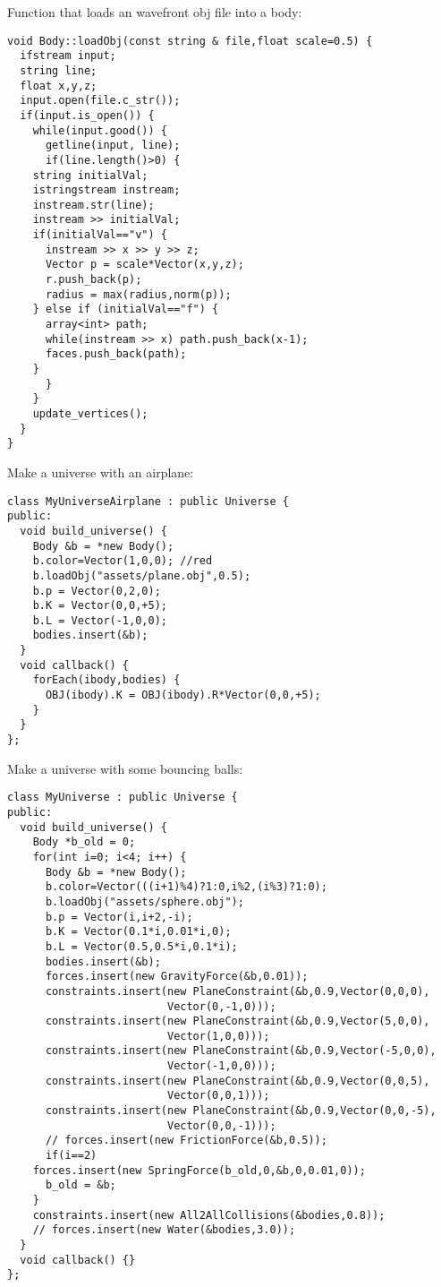 \noindent
Function that loads an wavefront obj file into a body: \begin{lstlisting}
void Body::loadObj(const string & file,float scale=0.5) {
  ifstream input;
  string line;
  float x,y,z;
  input.open(file.c_str());
  if(input.is_open()) {
    while(input.good()) {
      getline(input, line);
      if(line.length()>0) {
	string initialVal;
	istringstream instream;
	instream.str(line);
	instream >> initialVal;
	if(initialVal=="v") {
	  instream >> x >> y >> z;
	  Vector p = scale*Vector(x,y,z);
	  r.push_back(p);
	  radius = max(radius,norm(p));
	} else if (initialVal=="f") {
	  array<int> path;
	  while(instream >> x) path.push_back(x-1);
	  faces.push_back(path);
	}
      }
    }
    update_vertices();
  }
}
\end{lstlisting}
\noindent
Make a universe with an airplane: \begin{lstlisting}
class MyUniverseAirplane : public Universe {
public:
  void build_universe() {
    Body &b = *new Body();
    b.color=Vector(1,0,0); //red
    b.loadObj("assets/plane.obj",0.5);
    b.p = Vector(0,2,0);
    b.K = Vector(0,0,+5);
    b.L = Vector(-1,0,0);
    bodies.insert(&b);
  }
  void callback() {
    forEach(ibody,bodies) {
      OBJ(ibody).K = OBJ(ibody).R*Vector(0,0,+5);
    }
  }
};
\end{lstlisting}
\noindent
Make a universe with some bouncing balls: \begin{lstlisting}
class MyUniverse : public Universe {
public:
  void build_universe() {
    Body *b_old = 0;
    for(int i=0; i<4; i++) {
      Body &b = *new Body();
      b.color=Vector(((i+1)%4)?1:0,i%2,(i%3)?1:0);
      b.loadObj("assets/sphere.obj");
      b.p = Vector(i,i+2,-i);
      b.K = Vector(0.1*i,0.01*i,0);
      b.L = Vector(0.5,0.5*i,0.1*i);
      bodies.insert(&b);
      forces.insert(new GravityForce(&b,0.01));
      constraints.insert(new PlaneConstraint(&b,0.9,Vector(0,0,0),
					     Vector(0,-1,0)));
      constraints.insert(new PlaneConstraint(&b,0.9,Vector(5,0,0),
					     Vector(1,0,0)));
      constraints.insert(new PlaneConstraint(&b,0.9,Vector(-5,0,0),
					     Vector(-1,0,0)));
      constraints.insert(new PlaneConstraint(&b,0.9,Vector(0,0,5),
					     Vector(0,0,1)));
      constraints.insert(new PlaneConstraint(&b,0.9,Vector(0,0,-5),
					     Vector(0,0,-1)));
      // forces.insert(new FrictionForce(&b,0.5));
      if(i==2)
	forces.insert(new SpringForce(b_old,0,&b,0,0.01,0));
      b_old = &b;
    }
    constraints.insert(new All2AllCollisions(&bodies,0.8));
    // forces.insert(new Water(&bodies,3.0));
  }
  void callback() {}
};
\end{lstlisting}
